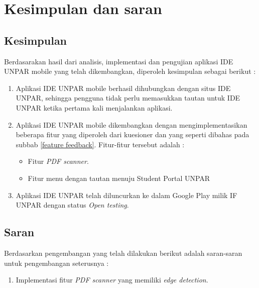 \chapter{Kesimpulan dan saran}

\section{Kesimpulan}

Berdasarakan hasil dari analisis, implementasi dan pengujian aplikasi IDE UNPAR mobile yang telah dikembangkan, diperoleh kesimpulan sebagai berikut :

\begin{enumerate}
\item Aplikasi IDE UNPAR mobile berhasil dihubungkan dengan situs IDE UNPAR, sehingga pengguna tidak perlu memasukkan tautan untuk IDE UNPAR ketika pertama kali menjalankan aplikasi.

\item Aplikasi IDE UNPAR mobile dikembangkan dengan mengimplementasikan beberapa fitur yang diperoleh dari kuesioner dan yang seperti dibahas pada subbab \ref{feature feedback}. Fitur-fitur tersebut adalah :
	\begin{itemize}
		\item Fitur \textit{PDF scanner}.
		\item  Fitur menu dengan tautan menuju Student Portal UNPAR
	\end{itemize}
	
\item Aplikasi IDE UNPAR telah diluncurkan ke dalam Google Play milik IF UNPAR dengan status \textit{Open testing}.
\end{enumerate}

\section{Saran}

Berdasarkan pengembangan yang telah dilakukan berikut adalah saran-saran untuk pengembangan seterusnya :

\begin{enumerate}
\item Implementasi fitur \textit{PDF scanner} yang memiliki \textit{edge detection}.

\end{enumerate}

